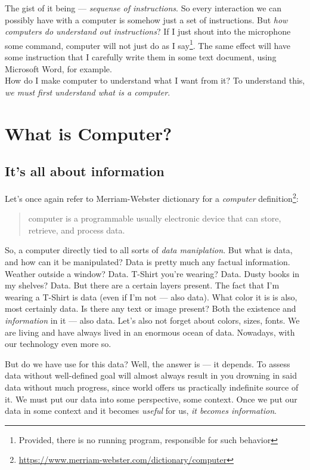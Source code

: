 \documentclass{article}
\begin{document}
        The gist of it being --- \emph{sequense of instructions}. So every interaction we can possibly have with a computer is somehow just a set of instructions. But \emph{how computers
        do understand out instructions}? If I just shout into the microphone some command, computer will not just do as I say\footnote{Provided, there is no running program, responsible for such behavior}.
        The same effect will have some instruction that I carefully write them in some text document, using Microsoft Word, for example.
        \\ 
        How do I make computer to understand what I want from it? To understand this, \emph{we must first understand what is a computer}.
        \newpage
    \section{What is Computer?}

        \subsection{It's all about information}
            Let's once again refer to Merriam-Webster dictionary for a \emph{computer} definition\footnote{\href{https://www.merriam-webster.com/dictionary/computer}{https://www.merriam-webster.com/dictionary/computer}}:

            \begin{quote}
                computer is a programmable usually electronic device that can store, retrieve, and process data.
            \end{quote}

            So, a computer directly tied to all sorts of \emph{data maniplation}. But what is data, and how can it be manipulated? Data is pretty much any factual information.
            Weather outside a window? Data. T-Shirt you're wearing? Data. Dusty books in my shelves? Data. But there are a certain layers present. The fact that I'm wearing a T-Shirt 
            is data (even if I'm not --- also data). What color it is is also, most certainly data. Is there any text or image present?
            Both the existence and \emph{information} in it --- also data. Let's also not forget about colors, sizes, fonts. We are living and have always lived in an enormous ocean of data. Nowadays, with our technology even more so. \par
            
            But do we have use for this data? Well, the answer is --- it depends. To assess data without well-defined goal will almost always result in you drowning in said data without much progress,
            since world offers us practically indefinite source of it. We must put our data into some perspective, some context. Once we put our data in some context and it becomes \emph{useful} for us, \emph{it becomes information}.
            
\end{document}
